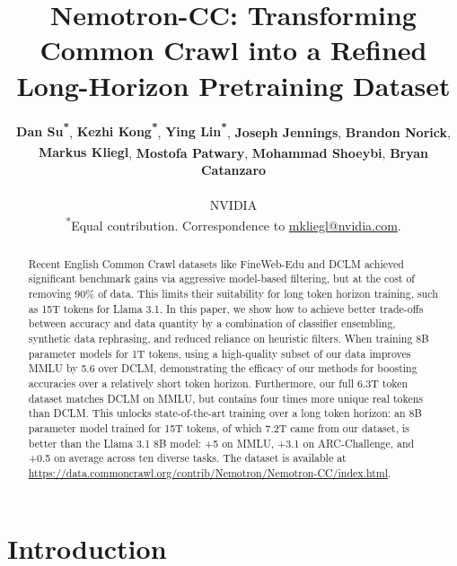 \documentclass[11pt]{article}
\title{Nemotron-CC: Transforming Common Crawl into a Refined Long-Horizon Pretraining Dataset}
\author{
 \textbf{Dan Su\textsuperscript{*}},
 \textbf{Kezhi Kong\textsuperscript{*}},
 \textbf{Ying Lin\textsuperscript{*}},
 \textbf{Joseph Jennings},
 \textbf{Brandon Norick},
\\
 \textbf{Markus Kliegl\textsuperscript{\textdagger}},
 \textbf{Mostofa Patwary},
 \textbf{Mohammad Shoeybi},
 \textbf{Bryan Catanzaro}
\\
\\
  NVIDIA
\\
 \small{
   \textsuperscript{*}Equal contribution. \textsuperscript{\textdagger}Correspondence to \href{mailto:mkliegl@nvidia.com}{mkliegl@nvidia.com}.
 }
}
\newcommand{\DCLM}{\textsc{DCLM}\xspace}
\begin{document}
\maketitle
\begin{abstract}
Recent English Common Crawl datasets like FineWeb-Edu and \DCLM achieved significant benchmark gains via aggressive model-based filtering, but at the cost of removing $90\%$ of data. This limits their suitability for long token horizon training, such as 15T tokens for Llama 3.1. In this paper, we show how to achieve better trade-offs between accuracy and data quantity by a combination of classifier ensembling, synthetic data rephrasing, and reduced reliance on heuristic filters.
When training 8B parameter models for 1T tokens, using a high-quality subset of our data improves MMLU by 5.6 over \DCLM, demonstrating the efficacy of our methods for boosting accuracies over a relatively short token horizon. Furthermore, our full 6.3T token dataset matches \DCLM on MMLU, but contains four times more unique real tokens than \DCLM. This unlocks state-of-the-art training over a long token horizon: an 8B parameter model trained for 15T tokens, of which 7.2T came from our dataset, is better than the Llama 3.1 8B model: +5 on MMLU, +3.1 on ARC-Challenge, and +0.5 on average across ten diverse tasks.
The dataset is available at \url{https://data.commoncrawl.org/contrib/Nemotron/Nemotron-CC/index.html}.
\end{abstract}

\section{Introduction}
\end{document}
